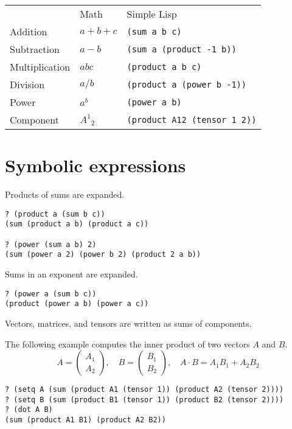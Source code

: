 \documentclass[12pt]{article}
\begin{document}
\begin{center}
\begin{tabular}{lll}
& Math & Simple Lisp
\\[1ex]
Addition & $a+b+c$ & \verb$(sum a b c)$
\\[1ex]
Subtraction & $a-b$ & \verb$(sum a (product -1 b))$
\\[1ex]
Multiplication & $abc$ & \verb$(product a b c)$
\\[1ex]
Division & $a/b$ & \verb$(product a (power b -1))$
\\[1ex]
Power & $a^b$ & \verb$(power a b)$
\\[1ex]
Component & $A^1{}_2$ & \verb$(product A12 (tensor 1 2))$
\end{tabular}
\end{center}

\section*{Symbolic expressions}

Products of sums are expanded.
\begin{verbatim}
? (product a (sum b c))
(sum (product a b) (product a c))

? (power (sum a b) 2)
(sum (power a 2) (power b 2) (product 2 a b))
\end{verbatim}

Sums in an exponent are expanded.
\begin{verbatim}
? (power a (sum b c))
(product (power a b) (power a c))
\end{verbatim}

Vectors, matrices, and tensors are written as sums of components.

\bigskip
The following example computes the inner product of two vectors $A$ and $B$.
\begin{equation*}
A=\begin{pmatrix}A_1\\A_2\end{pmatrix},
\quad
B=\begin{pmatrix}B_1\\B_2\end{pmatrix},
\quad
A\cdot B=A_1B_1+A_2B_2
\end{equation*}
\begin{verbatim}
? (setq A (sum (product A1 (tensor 1)) (product A2 (tensor 2))))
? (setq B (sum (product B1 (tensor 1)) (product B2 (tensor 2))))
? (dot A B)
(sum (product A1 B1) (product A2 B2))
\end{verbatim}
\end{document}

